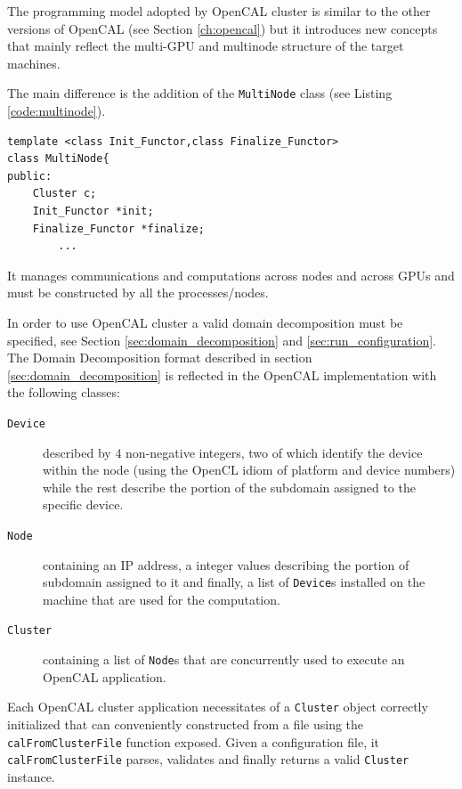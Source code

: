 The programming model adopted by OpenCAL cluster is similar to the other versions of OpenCAL (see Section \ref{ch:opencal}) but it introduces new concepts that mainly reflect the multi-GPU and multinode structure of the target machines.

The main difference is the addition of the \texttt{MultiNode} class (see Listing \ref{code:multinode}).
\begin{lstlisting}
template <class Init_Functor,class Finalize_Functor>
class MultiNode{
public:
	Cluster c;
	Init_Functor *init;
	Finalize_Functor *finalize;
		...
\end{lstlisting}
It manages communications and computations across nodes and across GPUs and must be constructed by all the processes/nodes.

In order to use OpenCAL  cluster a  valid domain decomposition must be specified, see Section \ref{sec:domain_decomposition} and \ref{sec:run_configuration}.
The Domain Decomposition format described in section \ref{sec:domain_decomposition} is reflected in the OpenCAL implementation with the following classes:
\begin{description}
	\item[\texttt{Device}] described by $4$ non-negative integers, two of which identify the device  within the node (using the OpenCL idiom of platform and device numbers) while the rest describe the portion of the subdomain assigned to the specific device.
	\item[\texttt{Node}] containing an IP address, a integer values describing the portion of subdomain assigned to it and finally, a list of \texttt{Device}s installed on the machine that are used for the computation.
	\item [\texttt{Cluster}] containing a list of \texttt{Node}s that are concurrently used to  execute an OpenCAL application.
\end{description}
Each OpenCAL cluster application necessitates of a \texttt{Cluster} object correctly initialized that can conveniently constructed from a file using the \texttt{calFromClusterFile} function exposed. Given a configuration file, it  \texttt{calFromClusterFile} parses, validates and finally returns a valid \texttt{Cluster} instance.

